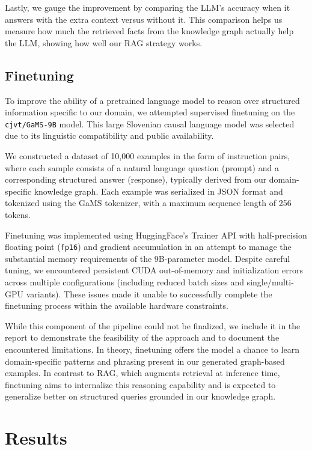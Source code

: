 \documentclass[fleqn,moreauthors,10pt]{ds_report}
\begin{document}
Lastly, we gauge the improvement by comparing the LLM's accuracy when it answers with the extra context versus without it. This comparison helps us measure how much the retrieved facts from the knowledge graph actually help the LLM, showing how well our RAG strategy works.

\subsection*{Finetuning}

To improve the ability of a pretrained language model to reason over structured information specific to our domain, we attempted supervised finetuning on the \texttt{cjvt/GaMS-9B} model. This large Slovenian causal language model was selected due to its linguistic compatibility and public availability.

We constructed a dataset of 10{,}000 examples in the form of instruction pairs, where each sample consists of a natural language question (prompt) and a corresponding structured answer (response), typically derived from our domain-specific knowledge graph. Each example was serialized in JSON format and tokenized using the GaMS tokenizer, with a maximum sequence length of 256 tokens.

Finetuning was implemented using HuggingFace’s Trainer API with half-precision floating point (\texttt{fp16}) and gradient accumulation in an attempt to manage the substantial memory requirements of the 9B-parameter model. Despite careful tuning, we encountered persistent CUDA out-of-memory and initialization errors across multiple configurations (including reduced batch sizes and single/multi-GPU variants). These issues made it unable to successfully complete the finetuning process within the available hardware constraints.

While this component of the pipeline could not be finalized, we include it in the report to demonstrate the feasibility of the approach and to document the encountered limitations. In theory, finetuning offers the model a chance to learn domain-specific patterns and phrasing present in our generated graph-based examples. In contrast to RAG, which augments retrieval at inference time, finetuning aims to internalize this reasoning capability and is expected to generalize better on structured queries grounded in our knowledge graph.

\section*{Results}
\end{document}
